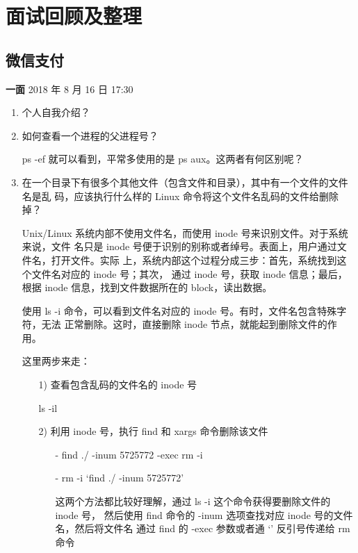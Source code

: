 \section{面试回顾及整理}\label{sec:interviews-and-reviews}

\subsection{微信支付}

\noindent\textbf{一面} 2018 年 8 月 16 日 17:30

\begin{enumerate}
\item 个人自我介绍？
\item 如何查看一个进程的父进程号？

  ps -ef 就可以看到，平常多使用的是 ps aux。这两者有何区别呢？
  
\item 在一个目录下有很多个其他文件（包含文件和目录），其中有一个文件的文件名是乱
  码，应该执行什么样的 Linux 命令将这个文件名乱码的文件给删除掉？

  Unix/Linux 系统内部不使用文件名，而使用 inode 号来识别文件。对于系统来说，文件
  名只是 inode 号便于识别的别称或者绰号。表面上，用户通过文件名，打开文件。实际
  上，系统内部这个过程分成三步：首先，系统找到这个文件名对应的 inode 号；其次，
  通过 inode 号，获取 inode 信息；最后，根据 inode 信息，找到文件数据所在的
  block，读出数据。

  使用 ls -i 命令，可以看到文件名对应的 inode 号。有时，文件名包含特殊字符，无法
  正常删除。这时，直接删除 inode 节点，就能起到删除文件的作用。

  这里两步来走：

  \begin{enumerate}
  \item [1)] 查看包含乱码的文件名的 inode 号

    ls -il
    
  \item [2)] 利用 inode 号，执行 find 和 xargs 命令删除该文件

    \begin{itemize}
    \item [-] find ./ -inum 5725772 -exec rm -i {} \;
    \item [-] rm -i `find ./ -inum 5725772'

      这两个方法都比较好理解，通过 ls -i 这个命令获得要删除文件的 inode 号，
      然后使用 find 命令的 -inum 选项查找对应 inode 号的文件名，然后将文件名
      通过 find 的 -exec 参数或者通 `' 反引号传递给 rm 命令


\end{itemize}
\end{enumerate}
\end{enumerate}
